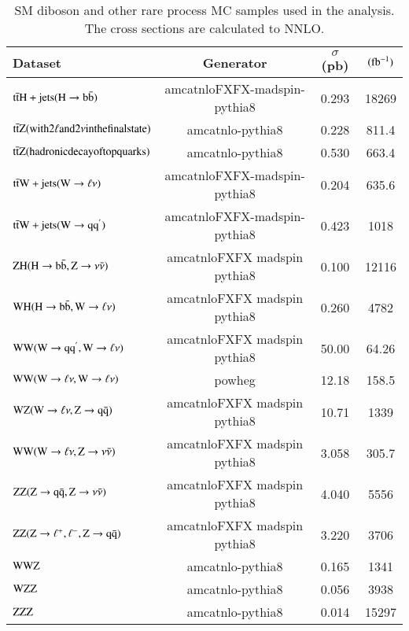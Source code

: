 \begin{table}[h]
\centering
\caption{SM diboson and other rare process MC samples used in the analysis. The cross
  sections are calculated to NNLO. }
\label{tab:rareMCsamples}
{\footnotesize
\begin{tabular}{lccc}
\hline \hline
Dataset & Generator & $\sigma$ (pb) & $ (\rm fb^{-1})$ \\
\hline
$\rm t\bar{t}H +jets (H\rightarrow b\bar{b})$   & amcatnloFXFX-madspin-pythia8 & 0.293 & 18269\\
$\rm t\bar{t}Z (with 2 \ell and 2 \nu in the final state)$  & amcatnlo-pythia8 & 0.228 & 811.4\\
$\rm t\bar{t}Z (hadronic decay of top quarks)$   & amcatnlo-pythia8 & 0.530 & 663.4\\
$\rm t\bar{t}W +jets (W\rightarrow \ell\nu)$  & amcatnloFXFX-madspin-pythia8 & 0.204 & 635.6\\
$\rm t\bar{t}W +jets (W\rightarrow qq^{'})$    & amcatnloFXFX-madspin-pythia8 & 0.423 & 1018\\
$\rm ZH (H\rightarrow b\bar{b},Z\rightarrow \nu\bar{\nu})$  &  amcatnloFXFX madspin pythia8 & 0.100 & 12116\\
$\rm WH (H\rightarrow b\bar{b},W\rightarrow \ell{\nu})$    & amcatnloFXFX madspin pythia8 & 0.260 & 4782\\
$\rm WW (W\rightarrow qq^{'},W\rightarrow \ell{\nu})$    & amcatnloFXFX madspin pythia8 & 50.00 & 64.26\\
$\rm WW (W\rightarrow \ell\nu,W\rightarrow \ell{\nu})$   & powheg & 12.18 & 158.5\\
$\rm WZ (W\rightarrow \ell\nu,Z\rightarrow q\bar{q})$&  amcatnloFXFX madspin pythia8 & 10.71 & 1339\\
$\rm WW (W\rightarrow \ell\nu,Z\rightarrow \nu\bar{\nu})$ &  amcatnloFXFX madspin pythia8 & 3.058 & 305.7\\
$\rm ZZ (Z\rightarrow q\bar{q},Z\rightarrow \nu\bar{\nu})$ & amcatnloFXFX madspin pythia8 & 4.040 & 5556\\
$\rm ZZ (Z\rightarrow \ell^{+},\ell^{-},Z\rightarrow q\bar{q})$ & amcatnloFXFX madspin pythia8 & 3.220 & 3706\\
$\rm WWZ$  & amcatnlo-pythia8 & 0.165 & 1341\\
$\rm WZZ$ & amcatnlo-pythia8 & 0.056 & 3938\\
$\rm ZZZ$  & amcatnlo-pythia8 & 0.014 & 15297\\
\hline \hline
\end{tabular}
}
\end{table}



